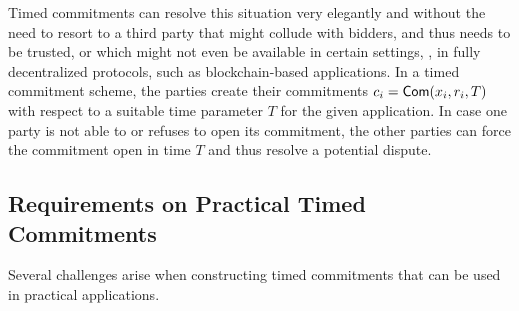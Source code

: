 Timed commitments can resolve this situation very elegantly and without the need to resort to a third party that might collude with bidders, and thus needs to be trusted, or which might not even be available in certain settings, \eg, in fully decentralized protocols, such as blockchain-based applications. 
In a timed commitment scheme, the parties create their commitments $c_i = \mathsf{Com}(x_i,r_i, T)$ with respect to a suitable time parameter $T$ for the given application. In case one party is not able to or refuses to open its commitment, the other parties can force the commitment open in time $T$ and thus resolve a potential dispute. 


\subsection{Requirements on Practical Timed Commitments}
Several challenges arise when constructing timed commitments that can be used in practical applications.


